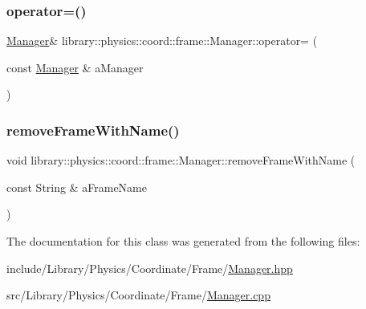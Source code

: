 \mbox{\label{classlibrary_1_1physics_1_1coord_1_1frame_1_1_manager_a187a04c135f48ec850a1fd616dd92a3b}} 
\subsubsection{\texorpdfstring{operator=()}{operator=()}}
{\footnotesize\ttfamily \hyperlink{classlibrary_1_1physics_1_1coord_1_1frame_1_1_manager}{Manager}\& library\+::physics\+::coord\+::frame\+::\+Manager\+::operator= (\begin{DoxyParamCaption}\item[{const \hyperlink{classlibrary_1_1physics_1_1coord_1_1frame_1_1_manager}{Manager} \&}]{a\+Manager }\end{DoxyParamCaption})\hspace{0.3cm}{\ttfamily [delete]}}

\mbox{\label{classlibrary_1_1physics_1_1coord_1_1frame_1_1_manager_a63e05e289d34f354dafefbff2b8478af}} 
\subsubsection{\texorpdfstring{remove\+Frame\+With\+Name()}{removeFrameWithName()}}
{\footnotesize\ttfamily void library\+::physics\+::coord\+::frame\+::\+Manager\+::remove\+Frame\+With\+Name (\begin{DoxyParamCaption}\item[{const String \&}]{a\+Frame\+Name }\end{DoxyParamCaption})}



The documentation for this class was generated from the following files\+:\begin{DoxyCompactItemize}
\item 
include/\+Library/\+Physics/\+Coordinate/\+Frame/\hyperlink{_manager_8hpp}{Manager.\+hpp}\item 
src/\+Library/\+Physics/\+Coordinate/\+Frame/\hyperlink{_manager_8cpp}{Manager.\+cpp}\end{DoxyCompactItemize}
